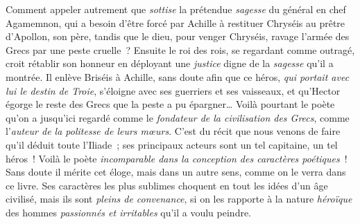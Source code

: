 \documentclass[french,twoside]{book} %
\begin{document}
Comment appeler autrement que {\itshape sottise} la prétendue {\itshape sagesse} du général en chef Agamemnon, qui a besoin d’être forcé par Achille à restituer Chryséis au prêtre d’Apollon, son père, tandis que le dieu, pour venger Chryséis, ravage l’armée des Grecs par une peste cruelle ? Ensuite le roi des rois, se regardant comme outragé, croit rétablir son honneur  en déployant une {\itshape justice} digne de la {\itshape sagesse} qu’il a montrée. Il enlève Briséis à Achille, sans doute afin que ce héros, {\itshape qui portait avec lui le destin de Troie}, s’éloigne avec ses guerriers et ses vaisseaux, et qu’Hector égorge le reste des Grecs que la peste a pu épargner… Voilà pourtant le poète qu’on a jusqu’ici regardé comme le {\itshape fondateur de la civilisation des Grecs}, comme l’{\itshape auteur de la politesse de leurs mœurs}. C’est du récit que nous venons de faire qu’il déduit toute l’Iliade ; ses principaux acteurs sont un tel capitaine, un tel héros ! Voilà le poète {\itshape incomparable dans la conception des caractères poétiques} ! Sans doute il mérite cet éloge, mais dans un autre sens, comme on le verra dans ce livre. Ses caractères les plus sublimes choquent en tout les idées d’un âge civilisé, mais ils sont {\itshape pleins de convenance}, si on les rapporte à la nature {\itshape héroïque} des hommes {\itshape passionnés et irritables} qu’il a voulu peindre.\par
\end{document}
